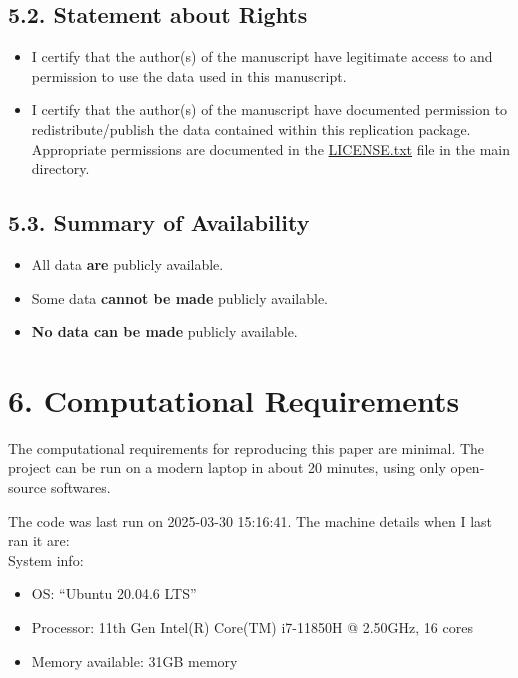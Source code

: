 \documentclass[10pt]{article}
\begin{document}
\subsection*{5.2. Statement about Rights}
\begin{itemize}[label=]
  \item [\ding{51}] I certify that the author(s) of the manuscript have legitimate access to and permission to use the data used in this manuscript.
  \item I certify that the author(s) of the manuscript have documented permission to redistribute/publish the data contained within this replication package. Appropriate permissions are documented in the \href{https://www.github.com/johnjosephhorton/minimum_wage/blob/main/LICENSE.txt}{LICENSE.txt} file in the main directory.
\end{itemize}

\subsection*{5.3. Summary of Availability}
\begin{itemize}[label=]
  \item All data \textbf{are} publicly available.
  \item Some data \textbf{cannot be made} publicly available.
  \item [\ding{51}] \textbf{No data can be made} publicly available.
\end{itemize}

\vspace{1em}
\section*{6. Computational Requirements}

The computational requirements for reproducing this paper are minimal. 
The project can be run on a modern laptop in about 20 minutes, using only open-source softwares.

The code was last run on 2025-03-30 15:16:41. The machine details when I last ran it are:\\
System info:
\begin{itemize}
    \item OS: ``Ubuntu 20.04.6 LTS''
    \item Processor: 11th Gen Intel(R) Core(TM) i7-11850H @ 2.50GHz, 16 cores
    \item Memory available: 31GB memory
\end{itemize}
\end{document}
